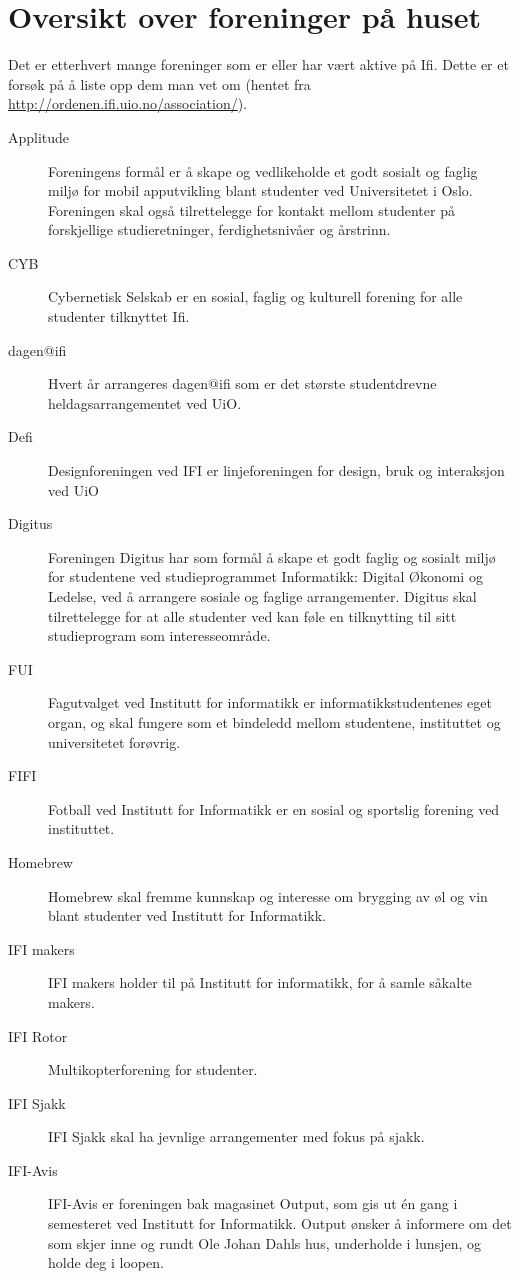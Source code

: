 \chapter*{Oversikt over foreninger på huset}

Det er etterhvert mange foreninger som er eller har vært aktive på Ifi. Dette er et forsøk på å liste opp dem man vet om (hentet fra \url{http://ordenen.ifi.uio.no/association/}).

\begin{description}
	\item[Applitude] Foreningens formål er å skape og vedlikeholde et godt sosialt og faglig miljø for mobil apputvikling blant studenter ved Universitetet i Oslo. Foreningen skal også tilrettelegge for kontakt mellom studenter på forskjellige studieretninger, ferdighetsnivåer og årstrinn.
	\item[CYB] Cybernetisk Selskab er en sosial, faglig og kulturell forening for alle studenter tilknyttet Ifi.
	\item[dagen@ifi] Hvert år arrangeres dagen@ifi som er det største studentdrevne heldagsarrangementet ved UiO.
	\item[Defi] Designforeningen ved IFI er linjeforeningen for design, bruk og interaksjon ved UiO
	\item[Digitus] Foreningen Digitus har som formål å skape et godt faglig og sosialt miljø for studentene ved studieprogrammet Informatikk: Digital Økonomi og Ledelse, ved å arrangere sosiale og faglige arrangementer. Digitus skal tilrettelegge for at alle studenter ved kan føle en tilknytting til sitt studieprogram som interesseområde.
	\item[FUI] Fagutvalget ved Institutt for informatikk er informatikkstudentenes eget organ, og skal fungere som et bindeledd mellom studentene, instituttet og universitetet forøvrig.
	\item [FIFI] Fotball ved Institutt for Informatikk er en sosial og sportslig forening ved instituttet.
	\item [Homebrew] Homebrew skal fremme kunnskap og interesse om brygging av øl og vin blant studenter ved Institutt for Informatikk.
	\item [IFI makers] IFI makers holder til på Institutt for informatikk, for å samle såkalte makers.
	\item [IFI Rotor] Multikopterforening for studenter.
	\item [IFI Sjakk] IFI Sjakk skal ha jevnlige arrangementer med fokus på sjakk.
	\item [IFI-Avis] IFI-Avis er foreningen bak magasinet Output, som gis ut én gang i semesteret ved Institutt for Informatikk. Output ønsker å informere om det som skjer inne og rundt Ole Johan Dahls hus, underholde i lunsjen, og holde deg i loopen.

\end{description}
